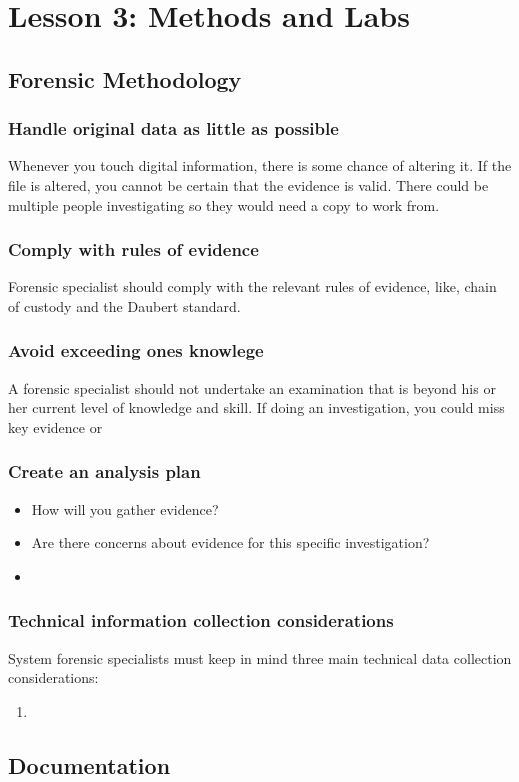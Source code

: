 \section{Lesson 3: Methods and Labs}
\subsection{Forensic Methodology}
\subsubsection{Handle original data as little as possible}
Whenever you touch digital information, there is some chance of altering it.
If the file is altered, you cannot be certain that the evidence is valid.
There could be multiple people investigating so they would need a copy to work from.

\subsubsection{Comply with rules of evidence}
Forensic specialist should comply with the relevant rules of evidence, like, chain of custody and the Daubert standard.
\subsubsection{Avoid exceeding ones knowlege}
A forensic specialist should not undertake an examination that is beyond his or her current level of knowledge and skill.
If doing an investigation, you could miss key evidence or

\subsubsection{Create an analysis plan}
\begin{itemize}
    \item How will you gather evidence?
    \item Are there concerns about evidence for this specific investigation?
    \item 
\end{itemize}
\subsubsection{Technical information collection considerations}
System forensic specialists must keep in mind three main technical data collection considerations:
\begin{enumerate}
    \item 
\end{enumerate}


\subsection{}

\subsection{Documentation}
